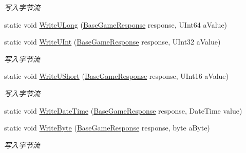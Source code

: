 \begin{DoxyCompactItemize}
\begin{DoxyCompactList}\small\item\em 写入字节流 \end{DoxyCompactList}\item 
static void \mbox{\hyperlink{class_t_net_1_1_service_1_1_data_struct_acc6877deb014858e06f99a40b67645ee}{Write\+U\+Long}} (\mbox{\hyperlink{class_t_net_1_1_service_1_1_base_game_response}{Base\+Game\+Response}} response, U\+Int64 a\+Value)
\item 
static void \mbox{\hyperlink{class_t_net_1_1_service_1_1_data_struct_ac7fbd76a6a49b07904c5eca3c7a7584c}{Write\+U\+Int}} (\mbox{\hyperlink{class_t_net_1_1_service_1_1_base_game_response}{Base\+Game\+Response}} response, U\+Int32 a\+Value)
\begin{DoxyCompactList}\small\item\em 写入字节流 \end{DoxyCompactList}\item 
static void \mbox{\hyperlink{class_t_net_1_1_service_1_1_data_struct_a03184827c8d0cf7dfa1b2ed11a2713ea}{Write\+U\+Short}} (\mbox{\hyperlink{class_t_net_1_1_service_1_1_base_game_response}{Base\+Game\+Response}} response, U\+Int16 a\+Value)
\begin{DoxyCompactList}\small\item\em 写入字节流 \end{DoxyCompactList}\item 
static void \mbox{\hyperlink{class_t_net_1_1_service_1_1_data_struct_a9d893adad23db1b2365bc57ec552cc1b}{Write\+Date\+Time}} (\mbox{\hyperlink{class_t_net_1_1_service_1_1_base_game_response}{Base\+Game\+Response}} response, Date\+Time value)
\item 
static void \mbox{\hyperlink{class_t_net_1_1_service_1_1_data_struct_ad6cfebd4f64edd86ca479c3c418fb5bc}{Write\+Byte}} (\mbox{\hyperlink{class_t_net_1_1_service_1_1_base_game_response}{Base\+Game\+Response}} response, byte a\+Byte)
\begin{DoxyCompactList}\small\item\em 写入字节流 \end{DoxyCompactList}\end{DoxyCompactItemize}
